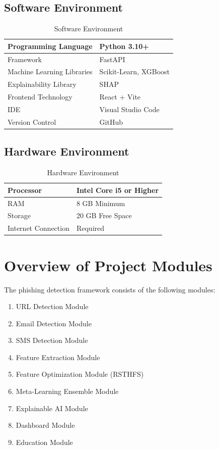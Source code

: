 \documentclass[12pt]{report}
\begin{document}
\subsection{Software Environment}

\begin{table}[H]
\centering
\caption{Software Environment}
\begin{tabular}{|l|l|}
\hline
Programming Language & Python 3.10+ \\
\hline
Framework & FastAPI \\
\hline
Machine Learning Libraries & Scikit-Learn, XGBoost \\
\hline
Explainability Library & SHAP \\
\hline
Frontend Technology & React + Vite \\
\hline
IDE & Visual Studio Code \\
\hline
Version Control & GitHub \\
\hline
\end{tabular}
\end{table}

\subsection{Hardware Environment}

\begin{table}[H]
\centering
\caption{Hardware Environment}
\begin{tabular}{|l|l|}
\hline
Processor & Intel Core i5 or Higher \\
\hline
RAM & 8 GB Minimum \\
\hline
Storage & 20 GB Free Space \\
\hline
Internet Connection & Required \\
\hline
\end{tabular}
\end{table}

\section{Overview of Project Modules}

The phishing detection framework consists of the following modules:

\begin{enumerate}
    \item URL Detection Module
    \item Email Detection Module
    \item SMS Detection Module
    \item Feature Extraction Module
    \item Feature Optimization Module (RSTHFS)
    \item Meta-Learning Ensemble Module
    \item Explainable AI Module
    \item Dashboard Module
    \item Education Module
\end{enumerate}
\end{document}
